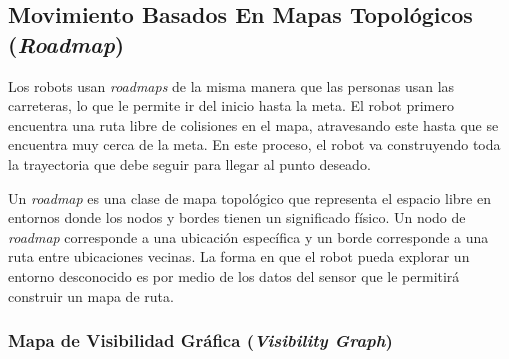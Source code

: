 \subsection{Movimiento Basados En Mapas Topol\'ogicos (\textit{Roadmap})}

Los robots usan \textit{roadmaps} de la misma manera que las personas usan 
las carreteras, lo que le permite ir del inicio hasta la meta. El robot 
primero encuentra una ruta libre de colisiones en el mapa, atravesando este 
hasta que se encuentra muy cerca de la meta. En este proceso, el robot va 
construyendo toda la trayectoria que debe seguir para llegar al punto deseado. 

Un \textit{roadmap} es una clase de mapa topol\'ogico que representa el 
espacio libre en entornos \cite{choset2005RoadMap} donde los nodos y bordes 
tienen un significado f\'isico. Un nodo de \textit{roadmap} corresponde a 
una ubicaci\'on espec\'ifica y un borde corresponde a una ruta entre ubicaciones 
vecinas. La forma en que el robot pueda explorar un entorno desconocido es por 
medio de los datos del sensor que le permitir\'a construir un mapa de ruta.




\subsubsection{Mapa de Visibilidad Gr\'afica (\textit{Visibility Graph})}

